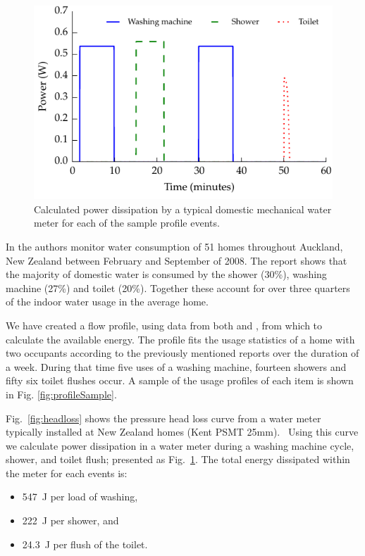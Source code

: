 \documentclass[10pt,final,journal]{IEEEtran}
\begin{document}
        \begin{figure}
            \begin{center}
            \includegraphics[width=\linewidth]{graph_harvest}
            \end{center}
            \caption{Calculated power dissipation by a typical domestic mechanical water meter for each of the sample profile events.}
            \label{fig:powerDissipated_meter}
        \end{figure}


        In \cite{Heinrich2008} the authors monitor water consumption of 51 homes throughout Auckland, New Zealand between February and September of 2008.
        The report shows that the majority of domestic water is consumed by the shower (30\%), washing machine (27\%) and toilet (20\%).
        Together these account for over three quarters of the indoor water usage in the average home.

        We have created a flow profile, using data from both \cite{Heinrich2008} and \cite{Heinrich2007}, from which to calculate the available energy.
        The profile fits the usage statistics of a home with two occupants according to the previously mentioned reports over the duration of a week.
        During that time five uses of a washing machine, fourteen showers and fifty six toilet flushes occur.
        A sample of the usage profiles of each item is shown in Fig. \ref{fig:profileSample}.

        Fig.~\ref{fig:headloss} shows the pressure head loss curve from a water meter typically installed at New Zealand homes (Kent PSMT 25mm).~\cite{WatercareNewZealand2014}
        Using this curve we calculate power dissipation in a water meter during a washing machine cycle, shower, and toilet flush; presented as Fig.~\ref{fig:powerDissipated_meter}.
        The total energy dissipated within the meter for each events is:
        \begin{itemize}
        \item \SI{547}{\joule} per load of washing,
        \item \SI{222}{\joule} per shower, and
        \item \SI{24.3}{\joule} per flush of the toilet.
        \end{itemize}
\end{document}
